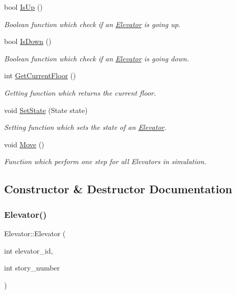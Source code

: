 \begin{DoxyCompactItemize}
$$bool \mbox{\hyperlink{class_elevator_aca2748809b28064bd231bdd1d41da2c8}{Is\+Up}} ()
\begin{DoxyCompactList}\small\item\em Boolean function which check if an \mbox{\hyperlink{class_elevator}{Elevator}} is going up. \end{DoxyCompactList}\item 
bool \mbox{\hyperlink{class_elevator_abc793c3aa503a743c3f1e1245f10d68b}{Is\+Down}} ()
\begin{DoxyCompactList}\small\item\em Boolean function which check if an \mbox{\hyperlink{class_elevator}{Elevator}} is going down. \end{DoxyCompactList}\item 
int \mbox{\hyperlink{class_elevator_afb9234ed92da547473353a8c95e64d4a}{Get\+Current\+Floor}} ()
\begin{DoxyCompactList}\small\item\em Getting function which returns the current floor. \end{DoxyCompactList}\item 
void \mbox{\hyperlink{class_elevator_a154bb4651ee4733f6d887d3f9cceb034}{Set\+State}} (State state)
\begin{DoxyCompactList}\small\item\em Setting function which sets the state of an \mbox{\hyperlink{class_elevator}{Elevator}}. \end{DoxyCompactList}\item 
\mbox{\label{class_elevator_ad64cda564f69dccdcc72385172f79923}} 
void \mbox{\hyperlink{class_elevator_ad64cda564f69dccdcc72385172f79923}{Move}} ()
\begin{DoxyCompactList}\small\item\em Function which perform one step for all Elevators in simulation. \end{DoxyCompactList}\end{DoxyCompactItemize}


\subsection{Constructor \& Destructor Documentation}
\mbox{\label{class_elevator_aa8a3857a468b3903c6f72032dd73c302}} 
\subsubsection{\texorpdfstring{Elevator()}{Elevator()}}
{\footnotesize\ttfamily Elevator\+::\+Elevator (\begin{DoxyParamCaption}\item[{int}]{elevator\+\_\+id,  }\item[{int}]{story\+\_\+number }\end{DoxyParamCaption})}



